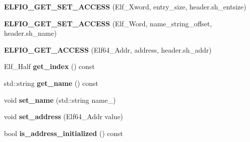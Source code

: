 \begin{DoxyCompactItemize}
\item 
{\bfseries E\+L\+F\+I\+O\+\_\+\+G\+E\+T\+\_\+\+S\+E\+T\+\_\+\+A\+C\+C\+E\+SS} (Elf\+\_\+\+Xword, entry\+\_\+size, header.\+sh\+\_\+entsize)\hypertarget{class_e_l_f_i_o_1_1section__impl_a9f1c1f653d9e45a283604420c27528bc}{}\label{class_e_l_f_i_o_1_1section__impl_a9f1c1f653d9e45a283604420c27528bc}

\item 
{\bfseries E\+L\+F\+I\+O\+\_\+\+G\+E\+T\+\_\+\+S\+E\+T\+\_\+\+A\+C\+C\+E\+SS} (Elf\+\_\+\+Word, name\+\_\+string\+\_\+offset, header.\+sh\+\_\+name)\hypertarget{class_e_l_f_i_o_1_1section__impl_ae32d702321ab65a68218feb068625a82}{}\label{class_e_l_f_i_o_1_1section__impl_ae32d702321ab65a68218feb068625a82}

\item 
{\bfseries E\+L\+F\+I\+O\+\_\+\+G\+E\+T\+\_\+\+A\+C\+C\+E\+SS} (Elf64\+\_\+\+Addr, address, header.\+sh\+\_\+addr)\hypertarget{class_e_l_f_i_o_1_1section__impl_a5fab2dd970264ef22e569407c6a6f842}{}\label{class_e_l_f_i_o_1_1section__impl_a5fab2dd970264ef22e569407c6a6f842}

\item 
Elf\+\_\+\+Half {\bfseries get\+\_\+index} () const \hypertarget{class_e_l_f_i_o_1_1section__impl_a35883bb9a5359f6a8746e3087f9d15d5}{}\label{class_e_l_f_i_o_1_1section__impl_a35883bb9a5359f6a8746e3087f9d15d5}

\item 
std\+::string {\bfseries get\+\_\+name} () const \hypertarget{class_e_l_f_i_o_1_1section__impl_af0656144641cf93f3e0d2b242dc66ce0}{}\label{class_e_l_f_i_o_1_1section__impl_af0656144641cf93f3e0d2b242dc66ce0}

\item 
void {\bfseries set\+\_\+name} (std\+::string name\+\_\+)\hypertarget{class_e_l_f_i_o_1_1section__impl_a0e4a83e85f2688239f7fa6b668d0b596}{}\label{class_e_l_f_i_o_1_1section__impl_a0e4a83e85f2688239f7fa6b668d0b596}

\item 
void {\bfseries set\+\_\+address} (Elf64\+\_\+\+Addr value)\hypertarget{class_e_l_f_i_o_1_1section__impl_a993bfe7884577b979790e42bf11df64b}{}\label{class_e_l_f_i_o_1_1section__impl_a993bfe7884577b979790e42bf11df64b}

\item 
bool {\bfseries is\+\_\+address\+\_\+initialized} () const \hypertarget{class_e_l_f_i_o_1_1section__impl_ad748b322bc9e1c9562db1647c9a4b6e5}{}\label{class_e_l_f_i_o_1_1section__impl_ad748b322bc9e1c9562db1647c9a4b6e5}


\end{DoxyCompactItemize}
